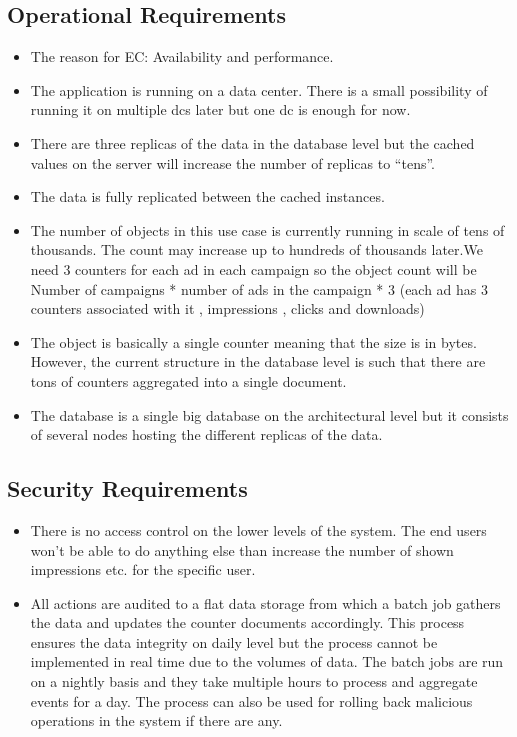 \documentclass[11pt,a4paper]{report}
\begin{document}
\subsection{Operational Requirements}
\begin{itemize}
\item The reason for EC: Availability and performance.
\item The application is running on a data center. There is a small possibility of running it on multiple \glspl{dc} later but one \gls{dc} is enough for now.
\item There are three replicas of the data in the database level but the cached values on the server will increase the number of replicas to ``tens''.
\item The data is fully replicated between the cached instances.
\item The number of objects in this use case is currently running in scale of tens of thousands. The count may increase up to hundreds of thousands later.We need 3 counters for each ad in each campaign so the object count will be Number of campaigns * number of ads in the campaign * 3 (each ad has 3 counters associated with it , impressions , clicks and downloads)
\item The object is basically a single counter meaning that the size is in bytes. However, the current structure in the database level is such that there are tons of counters aggregated into a single document.
\item The database is a single big database on the architectural level but it consists of several nodes hosting the different replicas of the data.
\end{itemize}

\subsection{Security Requirements}
\begin{itemize}
\item There is no access control on the lower levels of the system. The end users won't be able to do anything else than increase the number of shown impressions etc. for the specific user.
\item All actions are audited to a flat data storage from which a batch job gathers the data and updates the counter documents accordingly. This process ensures the data integrity on daily level but the process cannot be implemented in real time due to the volumes of data. The batch jobs are run on a nightly basis and they take multiple hours to process and aggregate events for a day.  The process can also be used for rolling back malicious operations in the system if there are any.
\end{itemize}
\end{document}
